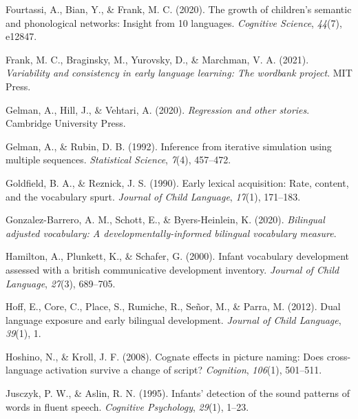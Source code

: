 \documentclass[
  letterpaper,
  DIV=11,
  numbers=noendperiod]{scrartcl}
\newlength{\cslhangindent}
\newlength{\cslentryspacingunit} %
\newenvironment{CSLReferences}[2] %
 {%
  \setlength{\parindent}{0pt}
  \ifodd #1
  \let\oldpar\par
  \def\par{\hangindent=\cslhangindent\oldpar}
  \fi
  \setlength{\parskip}{#2\cslentryspacingunit}
 }%
 {}
\begin{document}
\begin{CSLReferences}{1}{0}
\leavevmode{}%
Fourtassi, A., Bian, Y., \& Frank, M. C. (2020). The growth of
children's semantic and phonological networks: Insight from 10
languages. \emph{Cognitive Science}, \emph{44}(7), e12847.

\leavevmode{}%
Frank, M. C., Braginsky, M., Yurovsky, D., \& Marchman, V. A. (2021).
\emph{Variability and consistency in early language learning: The
wordbank project}. MIT Press.

\leavevmode{}%
Gelman, A., Hill, J., \& Vehtari, A. (2020). \emph{Regression and other
stories}. Cambridge University Press.

\leavevmode{}%
Gelman, A., \& Rubin, D. B. (1992). Inference from iterative simulation
using multiple sequences. \emph{Statistical Science}, \emph{7}(4),
457--472.

\leavevmode{}%
Goldfield, B. A., \& Reznick, J. S. (1990). Early lexical acquisition:
Rate, content, and the vocabulary spurt. \emph{Journal of Child
Language}, \emph{17}(1), 171--183.

\leavevmode{}%
Gonzalez-Barrero, A. M., Schott, E., \& Byers-Heinlein, K. (2020).
\emph{Bilingual adjusted vocabulary: A developmentally-informed
bilingual vocabulary measure}.

\leavevmode{}%
Hamilton, A., Plunkett, K., \& Schafer, G. (2000). Infant vocabulary
development assessed with a british communicative development inventory.
\emph{Journal of Child Language}, \emph{27}(3), 689--705.

\leavevmode{}%
Hoff, E., Core, C., Place, S., Rumiche, R., Señor, M., \& Parra, M.
(2012). Dual language exposure and early bilingual development.
\emph{Journal of Child Language}, \emph{39}(1), 1.

\leavevmode{}%
Hoshino, N., \& Kroll, J. F. (2008). Cognate effects in picture naming:
Does cross-language activation survive a change of script?
\emph{Cognition}, \emph{106}(1), 501--511.

\leavevmode{}%
Jusczyk, P. W., \& Aslin, R. N. (1995). Infants' detection of the sound
patterns of words in fluent speech. \emph{Cognitive Psychology},
\emph{29}(1), 1--23.


\end{CSLReferences}
\end{document}
